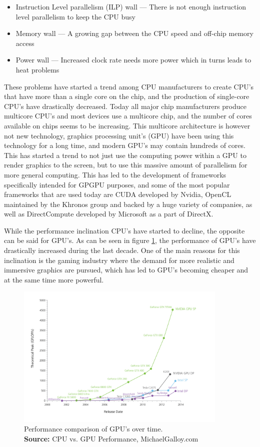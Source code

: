 \begin{itemize}
    \item Instruction Level parallelism (ILP) wall --- There is not enough instruction level parallelism to keep the CPU busy
    \item Memory wall --- A growing gap between the CPU speed and off-chip memory access
    \item Power wall --- Increased clock rate needs more power which in turns leads to heat problems
\end{itemize}

These problems have started a trend among CPU manufacturers to create CPU's that have more than a single core on the chip, and the production of single-core CPU's have drastically decreased. Today all major chip manufacturers produce multicore CPU's and most devices use a multicore chip, and the number of cores available on chips seems to be increasing. This multicore architecture is however not new technology, graphics processing unit's (GPU) have been using this technology for a long time, and modern GPU's may contain hundreds of cores. This has started a trend to not just use the computing power within a GPU to render graphics to the screen, but to use this massive amount of parallelism for more general computing. This has led to the development of frameworks specifically intended for GPGPU purposes, and some of the most popular frameworks that are used today are CUDA developed by Nvidia, OpenCL maintained by the Khronos group and backed by a huge variety of companies, as well as DirectCompute developed by Microsoft as a part of DirectX. 

While the performance inclination CPU's have started to decline, the opposite can be said for GPU's. As can be seen in figure \ref{fig:GPUStats}, the performance of GPU's have drastically increased during the last decade. One of the main reasons for this inclination is the gaming industry where the demand for more realistic and immersive graphics are pursued, which has led to GPU's becoming cheaper and at the same time more powerful.

\begin{figure}[!htbp]
    \centering
    \includegraphics [width=0.9\textwidth]{Introduction/Figs/GPUstats.png}
    \caption{Performance comparison of GPU's over time. \\ \textbf{Source:} CPU vs. GPU Performance, MichaelGalloy.com}
    \label{fig:GPUStats}
\end{figure}

